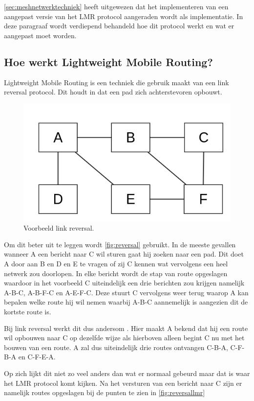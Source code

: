 \documentclass[a4paper, 11pt, oneside]{report}
\begin{document}
\autoref{sec:meshnetwerktechniek} heeft uitgewezen dat het implementeren van een aangepast versie van het LMR protocol aangeraden wordt als implementatie. In deze paragraaf wordt verdiepend behandeld hoe dit protocol werkt en wat er aangepast moet worden.

\subsection{Hoe werkt Lightweight Mobile Routing?}

Lightweight Mobile Routing is een techniek die gebruik maakt van een link reversal protocol. Dit houdt in dat een pad zich achterstevoren opbouwt.
 
\begin{figure}[H]
	\begin{center}\includegraphics[width=0.45\linewidth]{Afbeeldingen/reversal.png}\end{center}
	\caption{Voorbeeld link reversal.}
	\label{fig:reversal}
\end{figure} 

Om dit beter uit te leggen wordt  \autoref{fig:reversal} gebruikt.
In de meeste gevallen wanneer A een bericht naar C wil sturen gaat hij zoeken naar een pad. 
Dit doet A door aan B en D  en E te vragen of zij C kennen wat vervolgens een heel netwerk zou doorlopen.
In elke bericht wordt de stap van route opgeslagen waardoor in het voorbeeld C uiteindelijk een drie berichten zou krijgen namelijk A-B-C, A-B-F-C en A-E-F-C. Deze stuurt C vervolgens weer terug waarop A kan bepalen welke route hij wil nemen waarbij A-B-C aannemelijk is aangezien dit de kortste route is. 

Bij link reversal werkt dit dus andersom \cite{Vainio_linkreversal}.
Hier maakt A bekend dat hij een route wil opbouwen naar C op dezelfde wijze als hierboven alleen begint C nu met het bouwen van een route. 
A zal dus uiteindelijk drie routes ontvangen C-B-A, C-F-B-A en C-F-E-A.

Op zich lijkt dit niet zo veel anders dan wat er normaal gebeurd maar dat is waar het LMR protocol komt kijken.
Na het versturen van een bericht naar C zijn er namelijk routes opgeslagen bij de punten te zien in \autoref{fig:reversallmr}
\end{document}
